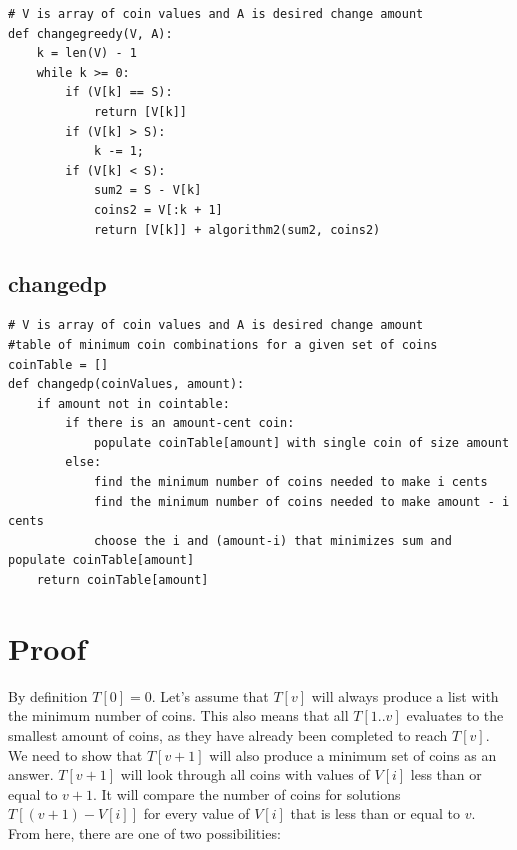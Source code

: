 \documentclass[letWterpaper,10pt,titlepage]{article}
\begin{document}
\begin{lstlisting}
# V is array of coin values and A is desired change amount
def changegreedy(V, A):
    k = len(V) - 1
    while k >= 0:
        if (V[k] == S):
            return [V[k]]
        if (V[k] > S):
            k -= 1;
        if (V[k] < S):
            sum2 = S - V[k]
            coins2 = V[:k + 1]
            return [V[k]] + algorithm2(sum2, coins2)
\end{lstlisting}

\subsection{changedp}

\begin{lstlisting}
# V is array of coin values and A is desired change amount
#table of minimum coin combinations for a given set of coins
coinTable = []
def changedp(coinValues, amount):
    if amount not in cointable:
        if there is an amount-cent coin:
            populate coinTable[amount] with single coin of size amount
        else:
            find the minimum number of coins needed to make i cents
            find the minimum number of coins needed to make amount - i cents
            choose the i and (amount-i) that minimizes sum and populate coinTable[amount]
    return coinTable[amount]
\end{lstlisting}

\section{Proof}
By definition $T[0]=0$.
Let's assume that $T[v]$ will always produce a list with the minimum number of coins. This also means that all $T[1..v]$ evaluates to the smallest amount of coins, as they have already been completed to reach $T[v]$. We need to show that $T[v+1]$ will also produce a minimum set of coins as an answer. $T[v+1]$ will look through all coins with values of $V[i]$ less than or equal to $v+1$. It will compare the number of coins for solutions $T[(v+1)-V[i]]$ for every value of $V[i]$ that is less than or equal to $v$. From here, there are one of two possibilities:
\end{document}
